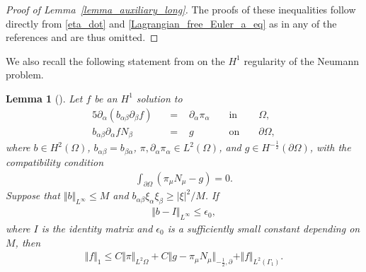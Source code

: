 \documentclass[10pt,reqno]{amsart}
\theoremstyle{plain}
\newtheorem{lemma}[theorem]{Lemma}
\theoremstyle{definition}
\numberwithin{equation}{section}
\newcommand{\al}{\alpha}
\newcommand{\be}{\beta}
\newcommand{\Ga}{\Gamma}
\newcommand{\Om}{\Omega}
\newcommand{\norm}[1]{\Vert#1\Vert}
\newcommand{\abs}[1]{\vert#1\vert}
\begin{document}
\begin{proof}[Proof of Lemma~\ref{lemma_auxiliary_long}]
The proofs of these inequalities follow directly
from 
\eqref{eta_dot}
and 
\eqref{Lagrangian_free_Euler_a_eq}
as in 
any of the references
\cite{IgorMihaelaSurfaceTension,KukavicaTuffaha-RegularityFreeEuler,KukavicaTuffahaVicol-3dFreeEuler}
and are thus omitted.
\end{proof}

We also recall the following statement from
\cite{IgorMihaelaSurfaceTension} on the $H^{1}$ 
regularity of the Neumann problem.

\begin{lemma}[\cite{IgorMihaelaSurfaceTension}]
\label{lemma_elliptic_estimate}
Let $f$ be an $H^1$ solution to
\begin{alignat}{5}
\partial_\al( b_{\al\be}\partial_\be f)  &&\, = \,& \, \partial_\al\pi_\al &&  \text{ in } &&  \Om,
\nonumber
\\
b_{\al\be} \partial_\al f N_\be &&\, = \,& \, g  &&  \text{ on } && \partial \Om,
\nonumber
\end{alignat}
where $b \in H^2(\Om)$, $b_{\al\be} = b_{\be\al}$, 
$\pi, \partial_\al \pi_\al \in L^2(\Om)$, 
and $g \in H^{-\frac{1}{2}}(\partial \Om)$, with the compatibility condition
\begin{gather}
\int_{\partial \Om} (\pi_\mu N_\mu - g ) = 0.
\nonumber
\end{gather}
Suppose that $\norm{b}_{L^\infty} \leq M$ and 
$b_{\al\be}\xi_\al \xi_\be \geq \abs{\xi}^2/M$. If
\begin{gather}
\norm{ b - I }_{L^{\infty}} \leq \epsilon_0,
\nonumber
\end{gather}
where $I$ is the identity matrix and $\epsilon_0$ is a sufficiently small constant depending
on $M$, then
\begin{gather}
\norm{f }_1 \leq 
C \norm{ \pi }_{L^2{\Om}} + C \norm{ g - \pi_\mu N_\mu }_{-\frac{1}{2},\partial}
+ \norm{f}_{L^2(\Ga_1)}.
\nonumber
\end{gather}
\end{lemma}

\end{document}
